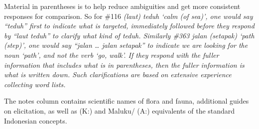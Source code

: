 Material in parentheses is to help reduce
ambiguities and get more consistent responses for comparison.
So for {\#}116 \it{(laut) teduh} ‘calm (of sea)’,
one would say “teduh” first to indicate what is targeted,
immediately followed before they respond by “laut teduh” to clarify
what kind of \it{teduh}.
Similarly {\#}363 \it{jalan (setapak)} ‘path (step)’,
one would say “jalan {\ldots} jalan setapak” to indicate we are
looking for the noun ‘path’,
and not the verb ‘go, walk’.
If they respond with the fuller information that includes what
is in parentheses, then the fuller information is what is written down.
Such clarifications are based on extensive experience collecting word lists.

The notes column contains scientific names of flora
and fauna, additional guides on elicitation,
as well as   (K:)
and Maluku/  (A:) equivalents of the standard Indonesian concepts.

